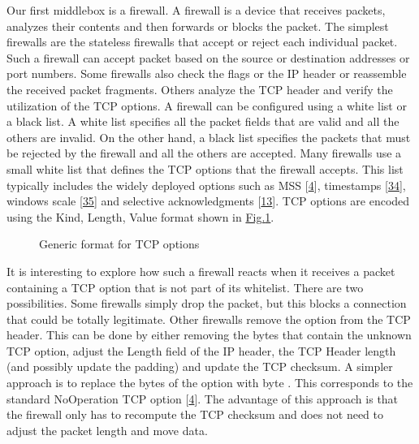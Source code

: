 \documentclass[letterpaper,10pt,english]{sphinxmanual}
\begin{document}
\sphinxAtStartPar
Our first middlebox is a firewall. A firewall is a device that receives packets, analyzes their contents and then forwards or blocks the packet. The simplest firewalls are the stateless firewalls that accept or reject each individual packet. Such a firewall can accept packet based on the source or destination addresses or port numbers. Some firewalls also check the flags or the IP header or reassemble the received packet fragments. Others analyze the TCP header and verify the utilization of the TCP options. A firewall can be configured using a white list or a black list. A white list specifies all the packet fields that are valid and all the others are invalid. On the other hand, a black list specifies the packets that must be rejected by the firewall and all the others are accepted. Many firewalls use a small white list that defines the TCP options that the firewall accepts. This list typically includes the widely deployed options such as MSS {[}\hyperlink{cite.biblio:id729}{4}{]}, timestamps {[}\hyperlink{cite.biblio:id7140}{34}{]}, windows scale {[}\hyperlink{cite.biblio:id1245}{35}{]} and selective acknowledgments {[}\hyperlink{cite.biblio:id1948}{13}{]}. TCP options are encoded using the Kind, Length, Value format shown in \hyperref[\detokenize{mptcp:fig-mptcp-tcp-option}]{Fig.\@ \ref{\detokenize{mptcp:fig-mptcp-tcp-option}}}.
\begin{figure}[htbp]\centering\capstart{}\caption{Generic format for TCP options}\label{\detokenize{mptcp:id76}}\label{\detokenize{mptcp:fig-mptcp-tcp-option}}\end{figure}
\sphinxAtStartPar
It is interesting to explore how such a firewall reacts when it receives a packet containing a TCP option that is not part of its whitelist. There are two possibilities. Some firewalls simply drop the packet, but this blocks a connection that could be totally legitimate. Other firewalls remove the option from the TCP header. This can be done by either removing the bytes that contain the unknown TCP option, adjust the Length field of the IP header, the TCP Header length (and possibly update the padding) and update the TCP checksum. A simpler approach is to replace the bytes of the option with byte . This corresponds to the standard No\sphinxhyphen{}Operation TCP option {[}\hyperlink{cite.biblio:id729}{4}{]}. The advantage of this approach is that the firewall only has to recompute the TCP checksum and does not need to adjust the packet length and move data.
\end{document}
